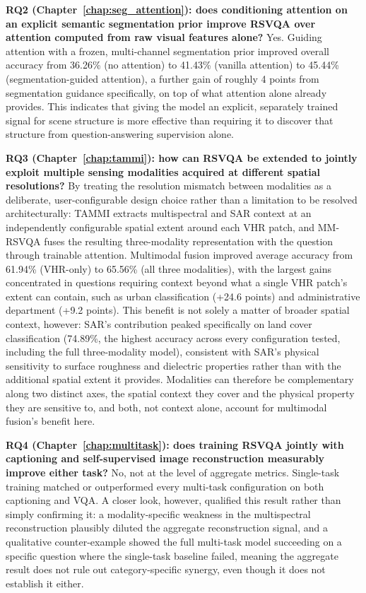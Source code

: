 \textbf{RQ2 (Chapter~\ref{chap:seg_attention}): does conditioning attention on an explicit semantic segmentation prior improve RSVQA over attention computed from raw visual features alone?} Yes. Guiding attention with a frozen, multi-channel segmentation prior improved overall accuracy from 36.26\% (no attention) to 41.43\% (vanilla attention) to 45.44\% (segmentation-guided attention), a further gain of roughly 4 points from segmentation guidance specifically, on top of what attention alone already provides. This indicates that giving the model an explicit, separately trained signal for scene structure is more effective than requiring it to discover that structure from question-answering supervision alone.

\textbf{RQ3 (Chapter~\ref{chap:tammi}): how can RSVQA be extended to jointly exploit multiple sensing modalities acquired at different spatial resolutions?} By treating the resolution mismatch between modalities as a deliberate, user-configurable design choice rather than a limitation to be resolved architecturally: TAMMI extracts multispectral and SAR context at an independently configurable spatial extent around each VHR patch, and MM-RSVQA fuses the resulting three-modality representation with the question through trainable attention. Multimodal fusion improved average accuracy from 61.94\% (VHR-only) to 65.56\% (all three modalities), with the largest gains concentrated in questions requiring context beyond what a single VHR patch's extent can contain, such as urban classification (+24.6 points) and administrative department (+9.2 points). This benefit is not solely a matter of broader spatial context, however: SAR's contribution peaked specifically on land cover classification (74.89\%, the highest accuracy across every configuration tested, including the full three-modality model), consistent with SAR's physical sensitivity to surface roughness and dielectric properties rather than with the additional spatial extent it provides. Modalities can therefore be complementary along two distinct axes, the spatial context they cover and the physical property they are sensitive to, and both, not context alone, account for multimodal fusion's benefit here.

\textbf{RQ4 (Chapter~\ref{chap:multitask}): does training RSVQA jointly with captioning and self-supervised image reconstruction measurably improve either task?} No, not at the level of aggregate metrics. Single-task training matched or outperformed every multi-task configuration on both captioning and VQA. A closer look, however, qualified this result rather than simply confirming it: a modality-specific weakness in the multispectral reconstruction plausibly diluted the aggregate reconstruction signal, and a qualitative counter-example showed the full multi-task model succeeding on a specific question where the single-task baseline failed, meaning the aggregate result does not rule out category-specific synergy, even though it does not establish it either.

